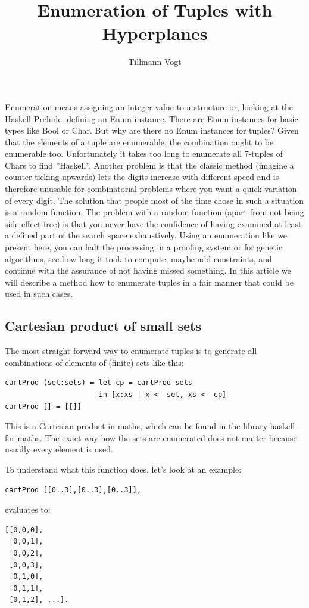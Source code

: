 \documentclass{tmr}
\title{Enumeration of Tuples with Hyperplanes} %
\author{Tillmann Vogt\email{tillk.vogt@googlemail.com}}
\newcommand{\authornote}[3]{{\color{#2} {\sc #1}: #3}}
\newcommand\bay[1]{\authornote{edward}{blue}{#1}}
\newcommand\tkv[1]{\authornote{Tillmann}{green}{#1}}
\begin{document}
\begin{introduction}
Enumeration means assigning an integer value to a structure or, looking at the Haskell Prelude, defining an Enum instance. There are Enum instances for basic types like Bool or Char. But why are there no Enum instances for tuples?  Given that the elements of a tuple are enumerable, the combination ought to be enumerable too. Unfortunately it takes  too long to \eg enumerate all 7-tuples of Chars to find ''Haskell''. Another problem is that the classic method (imagine a counter ticking upwards) lets the digits increase with different speed and is therefore unusable for combinatorial problems where you want a quick variation of every digit. The solution that people most of the time chose in such a situation is a random function. The problem with a random function (apart from not being side effect free) is that you never have the confidence of having examined at least a defined part of the search space exhaustively. Using an enumeration like we present here, you can halt the processing \eg in a proofing system or for genetic algorithms, see how long it took to compute, maybe add constraints, and continue with the assurance of not having missed something. In this article we will describe a method how to enumerate tuples in a fair manner that could be used in such cases.
\end{introduction}

\subsection{Cartesian product of small sets}

The most straight forward way to enumerate tuples is to generate all combinations of elements of (finite) sets like this:
\begin{Verbatim}
cartProd (set:sets) = let cp = cartProd sets
                      in [x:xs | x <- set, xs <- cp]
cartProd [] = [[]]
\end{Verbatim}
This is a Cartesian product in maths, which can be found in the library haskell-for-maths. The exact way how the sets are enumerated does not matter because usually every element is used.

To understand what this function does, let's look at an example:

\begin{Verbatim}
cartProd [[0..3],[0..3],[0..3]],
\end{Verbatim}
evaluates to:
\begin{Verbatim}
[[0,0,0],
 [0,0,1],
 [0,0,2],
 [0,0,3],
 [0,1,0],
 [0,1,1],
 [0,1,2], ...].
\end{Verbatim}
\end{document}
